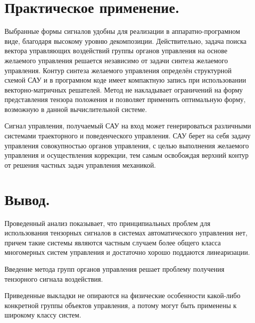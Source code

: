\documentclass[a4paper]{article}
\begin{document}
\section{Практическое применение.}
Выбранные формы сигналов удобны для реализации в аппаратно-програмном виде, благодаря высокому уровню декомпозиции. Действительно, задача поиска вектора управляющих воздействий группы органов управления на основе желаемого управления решается независимо от задачи синтеза желаемого управления. Контур синтеза желаемого управления определён структурной схемой САУ и в програмном коде имеет компактную запись при использовании векторно-матричных решателей. Метод не накладывает ограничений на форму представления тензора положения и позволяет применить оптимальную форму, возможную в данной вычислительной системе.

Сигнал управления, получаемый САУ на вход может генерироваться различными системами траекторного и поведенческого управления. САУ берет на себя задачу управления совокупностью органов управления, с целью выполнения желаемого управления и осуществления коррекции, тем самым освобождая верхний контур от решения частных задач управления механикой.

\section{Вывод.}
Проведенный анализ показывает, что принципиальных проблем для использования тензорных сигналов в системах автоматического управления нет, причем такие системы являются частным случаем более общего класса многомерных систем управления и достаточно хорошо поддаются линеаризации. 

Введение метода групп органов управления решает проблему получения тензорного сигнала воздействия.

Приведенные выкладки не опираются на физические особенности какой-либо конкретной группы объектов управления, а потому могут быть применены к широкому классу систем. 
\end{document}

